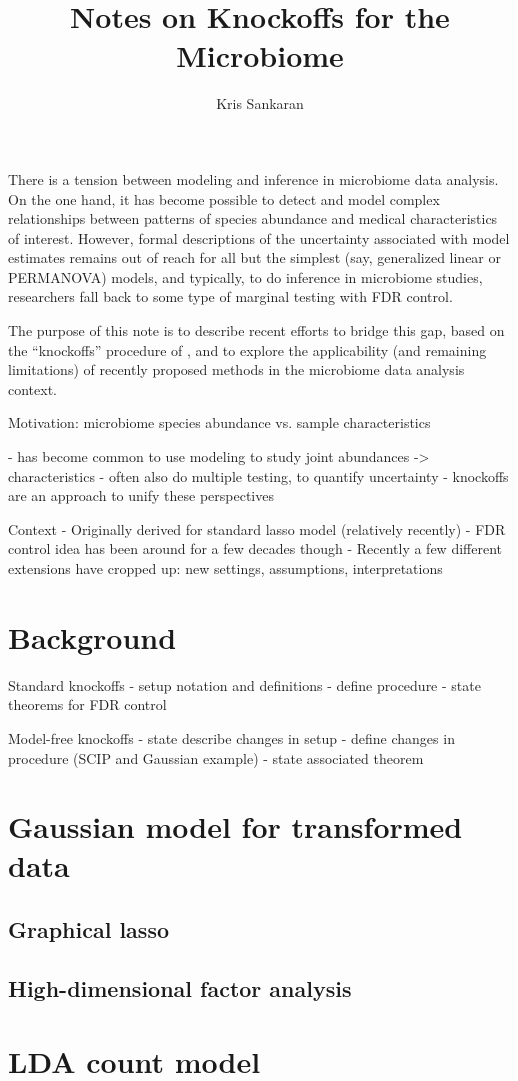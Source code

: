 \documentclass{article}
\title{Notes on Knockoffs for the Microbiome}
\author{Kris Sankaran}
\begin{document}
There is a tension between modeling and inference in microbiome data analysis.
On the one hand, it has become possible to detect and model complex
relationships between patterns of species abundance and medical characteristics
of interest. However, formal descriptions of the uncertainty associated with
model estimates remains out of reach for all but the simplest (say, generalized
linear or PERMANOVA) models, and typically, to do inference in microbiome
studies, researchers fall back to some type of marginal testing with FDR
control.

The purpose of this note is to describe recent efforts to bridge this gap, based
on the ``knockoffs'' procedure of \citep{}, and to explore the applicability
(and remaining limitations) of recently proposed methods in the microbiome data
analysis context.

Motivation: microbiome species abundance vs. sample characteristics

- has become common to use modeling to study joint abundances -> characteristics
- often also do multiple testing, to quantify uncertainty
- knockoffs are an approach to unify these perspectives

Context
- Originally derived for standard lasso model (relatively recently)
- FDR control idea has been around for a few decades though
- Recently a few different extensions have cropped up: new settings,
assumptions, interpretations


\section{Background}
\label{sec:background}

Standard knockoffs
- setup notation and definitions
- define procedure
- state theorems for FDR control

Model-free knockoffs
- state describe changes in setup
- define changes in procedure (SCIP and Gaussian example)
- state associated theorem

\section{Gaussian model for transformed data}
\label{sec:mf_gaussian_model}

\subsection{Graphical lasso}
\label{subsec:graphical_lasso}


\subsection{High-dimensional factor analysis}
\label{subsec:factor_analysis}

\section{LDA count model}
\label{sec:lda_count_model}
\end{document}
